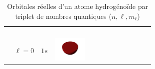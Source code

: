 \begin{landscape}
\begin{xltabular}{\linewidth}{C C C c c c c c c c}
\caption{Orbitales réelles d'un atome hydrogénoïde par triplet de nombres quantiques ($n, \ell, m_{\ell}$)\label{tab:geometrie_orbitale}\supercite{Wiki:OA}} 
\\
\toprule

 &  &  \\

\cmidrule(lr){1-2} \cmidrule(lr){4-10} %

 &  & &  &  &  &  \\

\midrule %

\endfirsthead %

\toprule

 &  &  \\

\cmidrule(lr){1-2} \cmidrule(lr){4-10} %

 &  & &  &  &  &  \\

\midrule %

\endhead %
	\addlinespace
	\midrule %
\endfoot %
\endlastfoot %

 &  &  & 
\includegraphics[width=1.6cm]{tableau_geometrie_orbitale_modelisation/S1M0.png} 


\end{xltabular}
\end{landscape}
